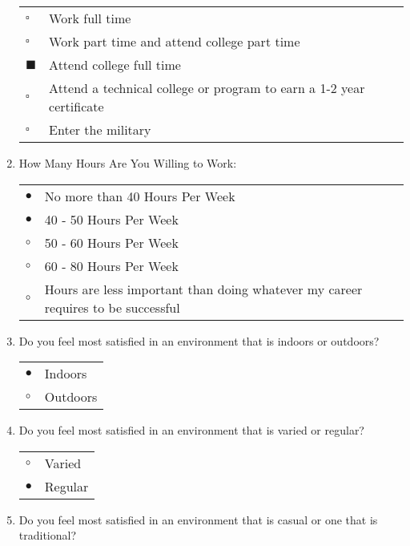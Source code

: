 \documentclass{article}
\begin{document}
\begin{enumerate}
\begin{tabular}{l l}
    $\square$ & Work full time\\
    $\square$  & Work part time and attend college part time\\
    $\blacksquare$ & Attend college full time\\
    $\square$ & Attend a technical college or program to earn a 1-2 year certificate\\
    $\square$ & Enter the military\\
    
\end{tabular}

\item How Many Hours Are You Willing to Work:\\

\begin{tabular}{l l}
    $\bullet$ & No more than 40 Hours Per Week\\
    $\bullet$  & 40 - 50 Hours Per Week\\
    $\circ$ & 50 - 60 Hours Per Week\\
    $\circ$ & 60 - 80 Hours Per Week\\
    $\circ$ & Hours are less important than doing whatever my career requires to be successful\\
    
\end{tabular}

\item Do you feel most satisfied in an environment that is indoors or outdoors? \\

\begin{tabular}{l l}
    $\bullet$ & Indoors\\
    $\circ$  & Outdoors\\
\end{tabular}

\item Do you feel most satisfied in an environment that is varied or regular? \\

\begin{tabular}{l l}
    $\circ$ & Varied\\
    $\bullet$  & Regular\\
\end{tabular}

\item Do you feel most satisfied in an environment that is casual or one that is traditional? \\


\end{enumerate}
\end{document}
